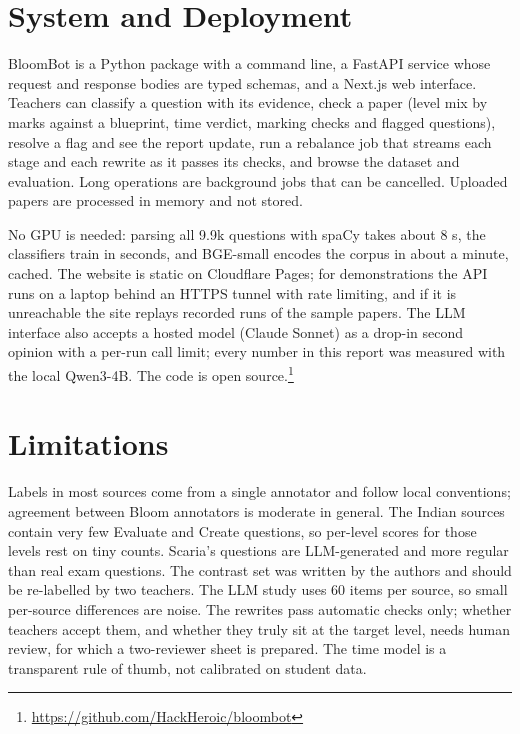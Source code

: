 \documentclass[conference]{IEEEtran}
\begin{document}
\section{System and Deployment}

BloomBot is a Python package with a command line, a FastAPI service whose request and response
bodies are typed schemas, and a Next.js web interface. Teachers can classify a question with its
evidence, check a paper (level mix by marks against a blueprint, time verdict, marking checks and
flagged questions), resolve a flag and see the report update, run a rebalance job that streams
each stage and each rewrite as it passes its checks, and browse the dataset and evaluation. Long
operations are background jobs that can be cancelled. Uploaded papers are processed in memory and
not stored.

No GPU is needed: parsing all 9.9k questions with spaCy takes about 8 s, the classifiers train in
seconds, and BGE-small encodes the corpus in about a minute, cached. The website is static on
Cloudflare Pages; for demonstrations the API runs on a laptop behind an HTTPS tunnel with rate
limiting, and if it is unreachable the site replays recorded runs of the sample papers. The LLM
interface also accepts a hosted model (Claude Sonnet) as a drop-in second opinion with a per-run
call limit; every number in this report was measured with the local Qwen3-4B. The code is open
source.\footnote{\url{https://github.com/HackHeroic/bloombot}}

\section{Limitations}

Labels in most sources come from a single annotator and follow local conventions; agreement
between Bloom annotators is moderate in general. The Indian sources contain very few Evaluate and
Create questions, so per-level scores for those levels rest on tiny counts. Scaria's questions are
LLM-generated and more regular than real exam questions. The contrast set was written by the
authors and should be re-labelled by two teachers. The LLM study uses 60 items per source, so
small per-source differences are noise. The rewrites pass automatic checks only; whether teachers
accept them, and whether they truly sit at the target level, needs human review, for which a
two-reviewer sheet is prepared. The time model is a transparent rule of thumb, not calibrated on
student data.
\end{document}
